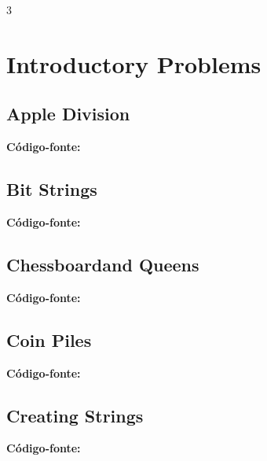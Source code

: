 \documentclass[8pt]{extarticle}
\begin{document}
\begin{multicols*}{3}

\section{Introductory Problems}

\subsection{Apple Division}
\begin{caixaenunciado}

\end{caixaenunciado}
\vspace{0.3cm}
\noindent\textbf{Código-fonte:}


\subsection{Bit Strings}
\begin{caixaenunciado}

\end{caixaenunciado}
\vspace{0.3cm}
\noindent\textbf{Código-fonte:}


\subsection{Chessboardand Queens}
\begin{caixaenunciado}

\end{caixaenunciado}
\vspace{0.3cm}
\noindent\textbf{Código-fonte:}


\subsection{Coin Piles}
\begin{caixaenunciado}

\end{caixaenunciado}
\vspace{0.3cm}
\noindent\textbf{Código-fonte:}


\subsection{Creating Strings}
\begin{caixaenunciado}

\end{caixaenunciado}
\vspace{0.3cm}
\noindent\textbf{Código-fonte:}



\end{multicols*}
\end{document}
